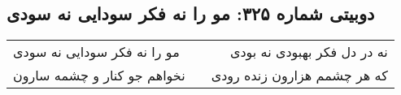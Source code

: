 \begin{center}
\section*{دوبیتی شماره ۳۲۵: مو را نه فکر سودایی نه سودی}
\label{sec:325}
\begin{longtable}{l p{0.5cm} r}
مو را نه فکر سودایی نه سودی
&&
نه در دل فکر بهبودی نه بودی
\\
نخواهم جو کنار و چشمه سارون
&&
که هر چشمم هزارون زنده رودی
\\
\end{longtable}
\end{center}

